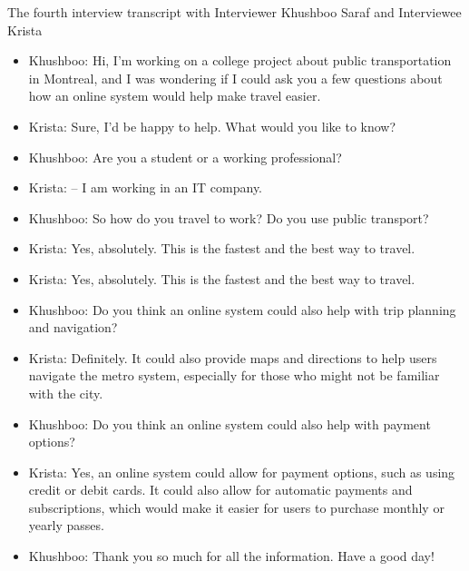 The fourth interview transcript with Interviewer Khushboo Saraf and Interviewee Krista

\begin{itemize}
    \item[] Khushboo: Hi, I'm working on a college project about public transportation in Montreal, and I was wondering if I could ask you a few questions about how an online system would help make travel easier.
    \item[] Krista: Sure, I'd be happy to help. What would you like to know?
    \item[] Khushboo: Are you a student or a working professional?
    \item[] Krista: – I am working in an IT company.
    \item[] Khushboo: So how do you travel to work? Do you use public transport?
    \item[] Krista: Yes, absolutely. This is the fastest and the best way to travel.
    \item[] Krista: Yes, absolutely. This is the fastest and the best way to travel.
    \item[] Khushboo: Do you think an online system could also help with trip planning and navigation?
    \item[] Krista: Definitely. It could also provide maps and directions to help users navigate the metro system, especially for those who might not be familiar with the city.
    \item[] Khushboo: Do you think an online system could also help with payment 
    options?
    \item[] Krista: Yes, an online system could allow for payment options, such as using credit or debit cards. It could also allow for automatic payments and subscriptions, which would make it easier for users to purchase monthly or yearly passes.
    \item[] Khushboo: Thank you so much for all the information. Have a good day!
\end{itemize}
\pagebreak